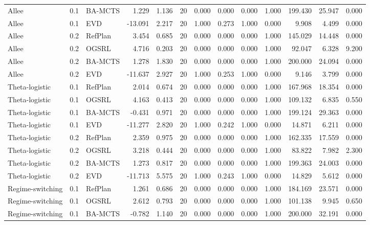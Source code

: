 \documentclass[10pt]{article}
\begin{document}
\begin{landscape}
\begin{center}
\begin{longtable}{@{}lllr@{}r@{}r@{}rrrrrrr@{}}
Allee & 0.1 & BA-MCTS & 1.229 & 1.136 & 20 & 0.000 & 0.000 & 0.000 & 1.000 & 199.430 & 25.947 & 0.000 \\
Allee & 0.1 & EVD & -13.091 & 2.217 & 20 & 1.000 & 0.273 & 1.000 & 0.000 & 9.908 & 4.499 & 0.000 \\
\addlinespace[1.5pt]
Allee & 0.2 & RefPlan & 3.454 & 0.685 & 20 & 0.000 & 0.000 & 0.000 & 1.000 & 145.029 & 14.448 & 0.000 \\
Allee & 0.2 & OGSRL & 4.716 & 0.203 & 20 & 0.000 & 0.000 & 0.000 & 1.000 & 92.047 & 6.328 & 9.200 \\
Allee & 0.2 & BA-MCTS & 1.278 & 1.830 & 20 & 0.000 & 0.000 & 0.000 & 1.000 & 200.000 & 24.094 & 0.000 \\
Allee & 0.2 & EVD & -11.637 & 2.927 & 20 & 1.000 & 0.253 & 1.000 & 0.000 & 9.146 & 3.799 & 0.000 \\
\addlinespace[1.5pt]
Theta-logistic & 0.1 & RefPlan & 2.014 & 0.674 & 20 & 0.000 & 0.000 & 0.000 & 1.000 & 167.968 & 18.354 & 0.000 \\
Theta-logistic & 0.1 & OGSRL & 4.163 & 0.413 & 20 & 0.000 & 0.000 & 0.000 & 1.000 & 109.132 & 6.835 & 0.550 \\
Theta-logistic & 0.1 & BA-MCTS & -0.431 & 0.971 & 20 & 0.000 & 0.000 & 0.000 & 1.000 & 199.124 & 29.363 & 0.000 \\
Theta-logistic & 0.1 & EVD & -11.277 & 2.820 & 20 & 1.000 & 0.242 & 1.000 & 0.000 & 14.871 & 6.211 & 0.000 \\
\addlinespace[1.5pt]
Theta-logistic & 0.2 & RefPlan & 2.359 & 0.975 & 20 & 0.000 & 0.000 & 0.000 & 1.000 & 162.335 & 17.559 & 0.000 \\
Theta-logistic & 0.2 & OGSRL & 3.218 & 0.444 & 20 & 0.000 & 0.000 & 0.000 & 1.000 & 83.822 & 7.982 & 2.300 \\
Theta-logistic & 0.2 & BA-MCTS & 1.273 & 0.817 & 20 & 0.000 & 0.000 & 0.000 & 1.000 & 199.363 & 24.003 & 0.000 \\
Theta-logistic & 0.2 & EVD & -11.713 & 5.575 & 20 & 1.000 & 0.243 & 1.000 & 0.000 & 14.829 & 5.612 & 0.000 \\
\addlinespace[1.5pt]
Regime-switching & 0.1 & RefPlan & 1.261 & 0.686 & 20 & 0.000 & 0.000 & 0.000 & 1.000 & 184.169 & 23.571 & 0.000 \\
Regime-switching & 0.1 & OGSRL & 2.612 & 0.793 & 20 & 0.000 & 0.000 & 0.000 & 1.000 & 101.138 & 9.945 & 0.650 \\
Regime-switching & 0.1 & BA-MCTS & -0.782 & 1.140 & 20 & 0.000 & 0.000 & 0.000 & 1.000 & 200.000 & 32.191 & 0.000 \\

\end{longtable}
\end{center}
\end{landscape}
\end{document}
